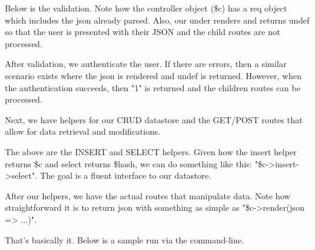 \documentclass[14pt]{extreport}
\begin{document}
Below is the validation.  Note how the controller object (\$c) has a req object
which includes the json already parsed.  Also, our under renders and returns
undef so that the user is presented with their JSON and the child routes are
not processed.



After validation, we authenticate the user.  If there are errors, then a
similar scenario exists where the json is rendered and undef is returned.
However, when the authentication succeeds, then "1" is returned and the 
children routes can be processed.



Next, we have helpers for our CRUD datastore and the GET/POST routes that allow
for data retrieval and modifications.



The above are the INSERT and SELECT helpers.  Given how the insert helper returns \$c and
select returns \$hash, we can do something like this: "\$c->insert->select".  The goal
is a fluent interface to our datastore.

After our helpers, we have the actual routes that manipulate data.  Note how straightforward
it is to return json with something as simple as "\$c->render(json => ...)".



That's basically it.  Below is a sample run via the command-line.
\end{document}
